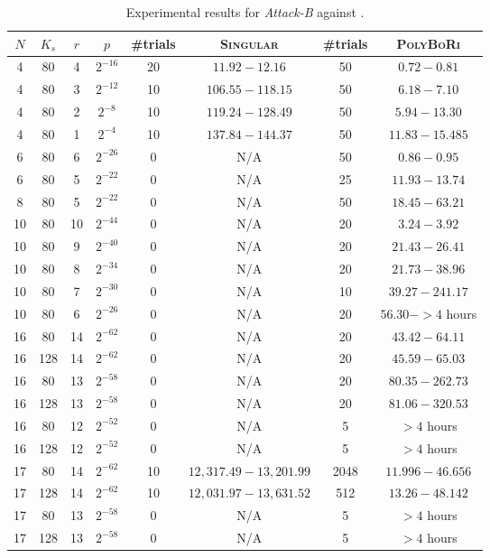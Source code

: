 \begin{table}
\begin{center}
\begin{tabular}{|c|c|c|c|c|c|c|c|}
\hline
$N$ & $K_s$ & $r$ & $p$ & \#trials & \textsc{Singular}& \#trials & \textsc{PolyBoRi}\\
\hline
 4 &  80 &  4 & $2^{-16}$ & 20 & $11.92-12.16$   & 50 & $0.72 - 0.81$ \\
 4 &  80 &  3 & $2^{-12}$ & 10 & $106.55-118.15$ & 50 & $6.18 - 7.10$ \\
 4 &  80 &  2 &  $2^{-8}$ & 10 & $119.24-128.49$ & 50 & $5.94 - 13.30$ \\
 4 &  80 &  1 &  $2^{-4}$ & 10 & $137.84-144.37$ & 50 & $11.83 - 15.485$
\\
\hline
 6 &  80 &  6 & $2^{-26}$ & 0 &  N/A               & 50 & $0.86 - 0.95$ \\
 6 &  80 &  5 & $2^{-22}$ & 0 &  N/A               & 25 & $11.93 - 13.74$ \\
\hline
 8 &  80 &  5 & $2^{-22}$ & 0 &  N/A               & 50 & $18.45 - 63.21$\\
\hline
10 &  80 & 10 & $2^{-44}$ & 0 &  N/A               & 20 & $3.24-3.92$ \\
10 &  80 &  9 & $2^{-40}$ & 0 &  N/A               & 20 & $21.43-26.41$ \\
10 &  80 &  8 & $2^{-34}$ & 0 &  N/A               & 20 & $21.73-38.96$ \\
10 &  80 &  7 & $2^{-30}$ & 0 &  N/A               & 10 & $39.27 - 241.17$\\
10 &  80 &  6 & $2^{-26}$ & 0 &  N/A               & 20 & $56.30 - >4$ hours\\
\hline
16 &  80 & 14 & $2^{-62}$ & 0 & N/A                & 20 & $43.42-64.11$ \\
16 & 128 & 14 & $2^{-62}$ & 0 & N/A                & 20 & $45.59-65.03$ \\
16 &  80 & 13 & $2^{-58}$ & 0 & N/A                & 20 & $80.35-262.73$\\
16 & 128 & 13 & $2^{-58}$ & 0 & N/A                & 20 & $81.06-320.53$ \\
16 &  80 & 12 & $2^{-52}$ & 0 & N/A                & 5 & $>4$ hours\\
16 & 128 & 12 & $2^{-52}$ & 0 & N/A                & 5 & $>4$ hours \\
\hline
17 &  80 & 14 & $2^{-62}$ & 10 & $12,317.49-13,201.99$ & 2048 & $11.996 - 46.656$\\
17 & 128 & 14 & $2^{-62}$ & 10 & $12,031.97-13,631.52$ & 512 & $13.26 - 48.142$\\
17 &  80 & 13 & $2^{-58}$ & 0 & N/A                & 5 & $>4$ hours\\
17 & 128 & 13 & $2^{-58}$ & 0 & N/A                & 5 & $>4$ hours\\
\hline
\end{tabular}
\end{center}
\caption{Experimental results for \emph{Attack-B} against \PRESENT.}
\label{tab:present-att-b}
\end{table}

